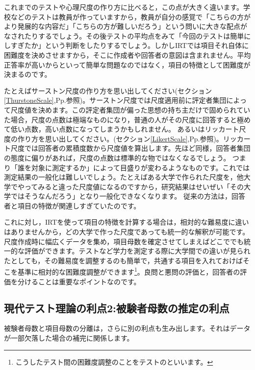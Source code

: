 \documentclass{ltjsbook}
\begin{document}
これまでのテストや心理尺度の作り方に比べると，この点が大きく違います。学校などのテストは教員が作っていますから，教員が自分の感覚で「こちらの方がより発展的な内容だ」「こちらの方が難しいだろう」という問いに大きな配点がなされたりするでしょう。その後テストの平均点をみて「今回のテストは簡単にしすぎたか」という判断をしたりするでしょう。しかしIRTでは項目それ自体に困難度を決めさせますから，そこに作成者や回答者の意図は含まれません。平均正答率が高いからといって簡単な問題なのではなく，項目の特徴として困難度が決まるのです。

たとえばサーストン尺度の作り方を思い出してください(セクション\ref{ThurstoneScale},Pp.\pageref{ThurstoneScale}参照)。サーストン尺度では尺度適用前に評定者集団によって尺度値を決めます。この評定者集団が偏った思想の持ち主だけで固められていた場合，尺度の点数は極端なものになり，普通の人がその尺度に回答すると極めて低い点数，高い点数になってしまうかもしれません。
あるいはリッカート尺度の作り方を思い出してください。(セクション\ref{LikertScale},Pp.\pageref{LikertScale}参照)。リッカート尺度では回答者の累積度数から尺度値を算出します。先ほど同様，回答者集団の態度に偏りがあれば，尺度の点数は標準的な物ではなくなるでしょう。
つまり「誰を対象に測定するか」によって目盛りが変わるようなものです。これでは測定結果の一般化は難しいでしょう。たとえばある大学で作られた尺度を，他大学でやってみると違った尺度値になるのですから，研究結果はせいぜい「その大学ではそうなんだろう」となり一般化できなくなります。
従来の方法は，回答者と項目の特徴が関連しすぎていたのです。

これに対し，IRTを使って項目の特徴を計算する場合は，相対的な難易度に違いはありませんから，どの大学で作った尺度であっても統一的な解釈が可能です。尺度作成時に幅広くデータを集め，項目母数を確定させてしまえばどこででも統一的な評価ができます。テストなど学力を測定する際に大学間での違いが見られたとしても，その難易度を調整するのも簡単で，共通する項目を入れておけばそこを基準に相対的な困難度調整ができます\footnote{こうしたテスト間の困難度調整のことをテストのといいます。}。良問と悪問の評価と，回答者の評価を分けることは重要なポイントなのです。
\subsection{現代テスト理論の利点2:被験者母数の推定の利点}
被験者母数と項目母数の分離は，さらに別の利点も生み出します。それはデータが一部欠落した場合の補完に関係します。
\end{document}
